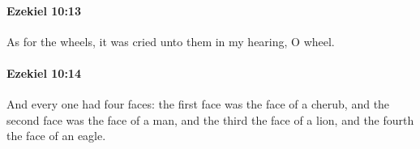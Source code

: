 		\paragraph{Ezekiel 10:13} %
			\label{EZEKIEL-10-13}

			As for the wheels, it was cried unto them in my hearing, O wheel.


		\paragraph{Ezekiel 10:14} %
			\label{EZEKIEL-10-14}

			And every one had four faces: the first face was the face of a cherub, and the second face was the face of a man, and the third the face of a lion, and the fourth the face of an eagle.


